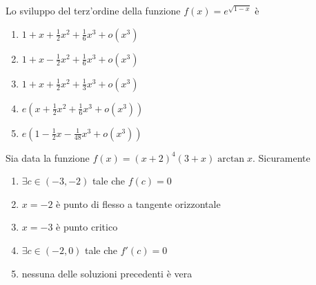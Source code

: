 \begin{quiz}
Lo sviluppo del terz’ordine della funzione $f(x)=e^{\sqrt{1-x}}$ è

\begin{enumerate}
\item $1+x+\frac12x^2+\frac16x^3+o(x^3)$
\item $1+x-\frac12x^2+\frac16x^3+o(x^3)$
\item $1+x+\frac12x^2+\frac13x^3+o(x^3)$
\item $e\left(x+\frac12x^2+\frac16x^3+o(x^3)\right)$
\item $e\left(1-\frac12x-\frac1{48}x^3+o(x^3)\right)$
\end{enumerate}
\end{quiz}

\begin{quiz}
Sia data la funzione $f(x)=(x+2)^4(3+x)\arctan x$. Sicuramente

\begin{enumerate}
\item $\exists c\in(-3,-2)$ tale che $f(c)=0$
\item $x=-2$ è punto di flesso a tangente orizzontale
\item $x=-3$ è punto critico
\item $\exists c\in(-2,0)$ tale che $f\prime(c)=0$
\item nessuna delle soluzioni precedenti è vera
\end{enumerate}
\end{quiz}


